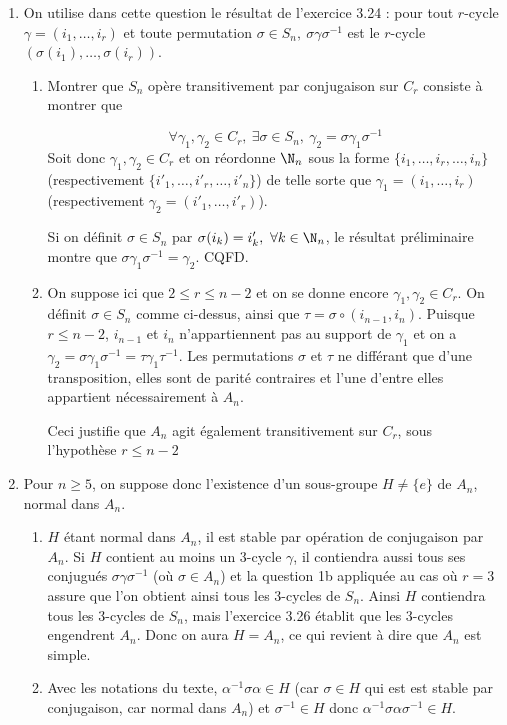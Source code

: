 
\begin{enumerate}[1)]
  \item On utilise dans cette question le résultat de l'exercice 3.24 : pour tout $r$-cycle $\gamma = (i_1,\ldots, i_r)$ et toute permutation $\sigma \in S_n,~ \sigma \gamma \sigma^{-1}$ est le $r$-cycle $\left(\sigma(i_1),\ldots, \sigma(i_r)\right)$.

  \begin{enumerate}
   \item Montrer que $S_n$ opère transitivement par conjugaison sur $C_r$ consiste à montrer que

   \[ \forall \gamma_1, \gamma_2 \in C_r,~ \exists \sigma \in S_n,~ \gamma_2 = \sigma \gamma_1 \sigma^{-1}\]
   Soit donc $\gamma_1, \gamma_2 \in C_r$ et on réordonne $\N_n$ sous la forme $\{i_1, \ldots, i_r,\ldots, i_n\}$ (respectivement $\{i'_1, \ldots, i'_r,\ldots, i'_n\}$) de telle sorte que $\gamma_1 = (i_1,\ldots, i_r)$ (respectivement $\gamma_2 = (i'_1,\ldots, i'_r)$).

   Si on définit $\sigma \in S_n$ par $\sigma(i_k) = i'_k, ~ \forall k \in \N_n$, le résultat préliminaire montre que $\sigma \gamma_1 \sigma^{-1} = \gamma_2$. CQFD.

   \item On suppose ici que $2\leqslant r \leqslant n-2$ et on se donne encore $\gamma_1, \gamma_2 \in C_r$. On définit $\sigma \in S_n$ comme ci-dessus, ainsi que $\tau = \sigma \circ (i_{n-1}, i_n)$. Puisque $r  \leqslant n-2$, $i_{n-1}$ et $ i_n$ n'appartiennent pas au support de $\gamma_1$ et on a $\gamma_2 = \sigma \gamma_1 \sigma^{-1} = \tau \gamma_1 \tau^{-1}$. Les permutations $\sigma$ et $\tau$ ne différant que d'une transposition, elles sont de parité contraires et l'une d'entre elles appartient nécessairement à $A_n$.

   Ceci justifie que $A_n$ agit également transitivement sur $C_r$, sous l'hypothèse $r \leqslant n-2$
    \end{enumerate}
    \item Pour $n\geqslant 5$, on suppose donc l'existence d'un sous-groupe $H\neq \{e\}$ de $A_n$, normal dans $A_n$.
    \begin{enumerate}
     \item $H$ étant normal dans $A_n$, il est stable par opération de conjugaison par $A_n$. Si $H$ contient au moins un 3-cycle $\gamma$, il contiendra aussi tous ses conjugués $\sigma \gamma \sigma^{-1}$ (où $\sigma \in A_n$) et la question 1b appliquée au cas où $r=3$ assure que l'on obtient ainsi tous les 3-cycles de $S_n$. Ainsi $H$ contiendra tous les 3-cycles de $S_n$, mais l'exercice 3.26 établit que les 3-cycles engendrent $A_n$. Donc on aura $H= A_n$, ce qui revient à dire que  $A_n$ est simple.
     \item Avec les notations du texte, $\alpha^{-1} \sigma \alpha \in H$ (car $\sigma \in H$ qui est est stable par conjugaison, car normal dans $A_n$) et $\sigma^{-1} \in H$ donc $\alpha^{-1} \sigma \alpha \sigma^{-1} \in H$.


\end{enumerate}
\end{enumerate}
